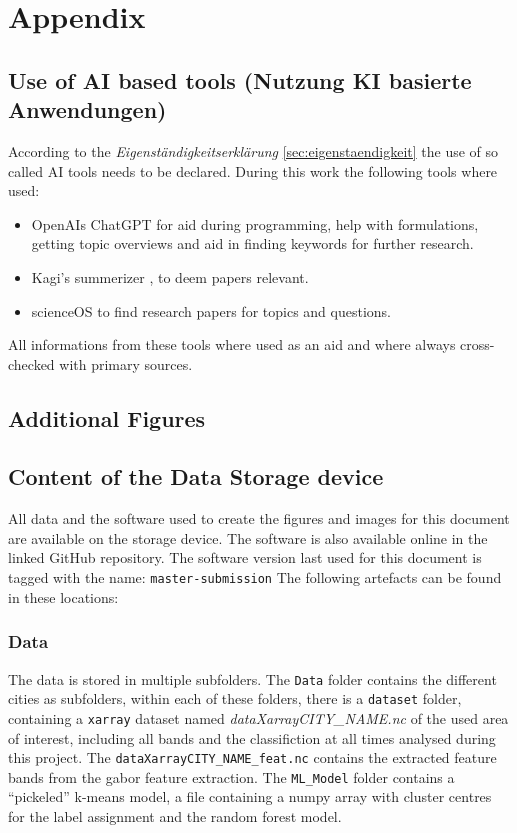 \documentclass[12pt,a4paper, english,twoside]{scrartcl}
\begin{document}
\section{Appendix}
  \subsection{Use of AI based tools (Nutzung KI basierte Anwendungen)}
  According to the \textit{Eigenständigkeitserklärung} \cref{sec:eigenstaendigkeit} the use of so called AI tools needs to be declared. 
    During this work the following tools where used: 
  \begin{itemize}
    \item OpenAIs ChatGPT \autocite{chatgpt} for aid during programming, help with formulations, getting topic overviews and aid in finding keywords for further research.
    \item Kagi's summerizer \autocite{kagi}, to deem papers relevant.
    \item scienceOS \autocite{scienceOS} to find research papers for topics and questions. 
    \end{itemize}
    All informations from these tools where used as an aid and where always cross-checked with primary sources. 
  \subsection{Additional Figures}
  \missingfigure{}
  \subsection{Content of the Data Storage device}
    All data and the software used to create the figures and images for this document are available on the storage device.
    The software is also available online in the linked GitHub repository.
    The software version last used for this document is tagged with the name: \texttt{master-submission}
    The following artefacts can be found in these locations:
  \subsubsection{Data}
    The data is stored in multiple subfolders. 
    The \texttt{Data} folder contains the different cities as subfolders, within each of these folders, there is a \texttt{dataset} folder, containing a \texttt{xarray} dataset named \textit{dataXarrayCITY\_NAME.nc} of the used area of interest, including all bands and the classifiction at all times analysed during this project. 
    The \texttt{dataXarrayCITY\_NAME\_feat.nc} contains the extracted feature bands from the gabor feature extraction.
    The \texttt{ML\_Model} folder contains a ``pickeled'' k-means model, a file containing a numpy array with cluster centres for the label assignment and the random forest model. 
\end{document}
